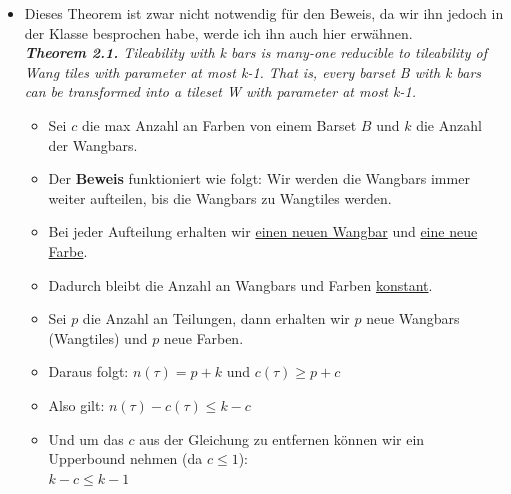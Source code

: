 \begin{itemize}
    \item Dieses Theorem ist zwar nicht notwendig für den Beweis, da wir ihn jedoch in der Klasse besprochen habe, werde ich ihn auch hier erwähnen.
    \\ {\itshape \textbf{Theorem 2.1.} Tileability with k bars is many-one reducible to tileability of Wang tiles with parameter at most k-1. That is, every barset B with k bars can be transformed into a tileset W with parameter at most k-1.}
    \begin{itemize}
        \item Sei $c$ die max Anzahl an Farben von einem Barset $B$ und $k$ die Anzahl der Wangbars.
        \item Der \textbf{Beweis} funktioniert wie folgt: Wir werden die Wangbars immer weiter aufteilen, bis die Wangbars zu Wangtiles werden.
        \item Bei jeder Aufteilung erhalten wir \underline{einen neuen Wangbar} und \underline{eine {neue} Farbe}.  
        \item Dadurch bleibt die Anzahl an Wangbars und Farben \underline{konstant}.
        \item Sei $p$ die Anzahl an Teilungen, dann erhalten wir $p$ neue Wangbars (Wangtiles) und $p$ neue Farben.
        \item Daraus folgt: $n(\tau) = p+k$ und $c(\tau)\geq p+c$
        \item Also gilt: $n(\tau) - c(\tau) \leq k-c$
        \item Und um das $c$ aus der Gleichung zu entfernen können wir ein Upperbound nehmen (da $c \leq 1$): \\$k-c \leq k - 1$
    \end{itemize}
    
    
    


\end{itemize}
